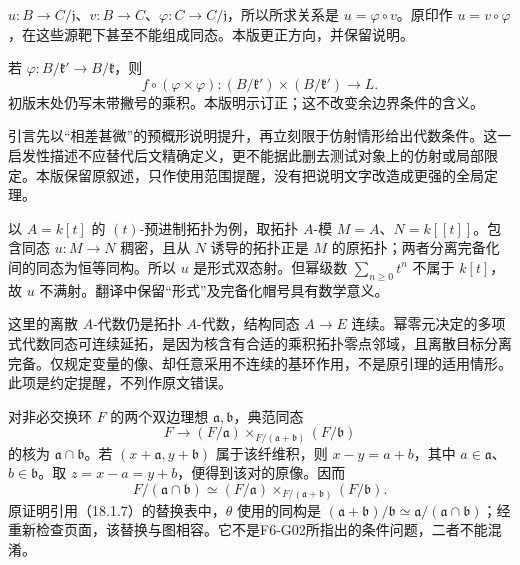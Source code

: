 $u:B\to C/\mathfrak j$、$v:B\to C$、$\varphi:C\to C/\mathfrak j$，所以所求关系是
$u=\varphi\circ v$。原印作 $u=v\circ\varphi$，在这些源靶下甚至不能组成同态。本版更正方向，并保留说明。

若 $\varphi:B/\mathfrak k'\to B/\mathfrak k$，则
\[
 f\circ(\varphi\times\varphi):
 (B/\mathfrak k')\times(B/\mathfrak k')\longrightarrow L.
\]
初版末处仍写未带撇号的乘积。本版明示订正；这不改变余边界条件的含义。

引言先以“相差甚微”的预概形说明提升，再立刻限于仿射情形给出代数条件。这一启发性描述不应替代后文精确定义，更不能据此删去测试对象上的仿射或局部限定。本版保留原叙述，只作使用范围提醒，没有把说明文字改造成更强的全局定理。

以 $A=k[t]$ 的 $(t)$-预进制拓扑为例，取拓扑 $A$-模 $M=A$、$N=k[[t]]$。包含同态 $u:M\to N$ 稠密，且从 $N$ 诱导的拓扑正是 $M$ 的原拓扑；两者分离完备化间的同态为恒等同构。所以 $u$ 是形式双态射。但幂级数 $\sum_{n\ge0}t^n$ 不属于 $k[t]$，故 $u$ 不满射。翻译中保留“形式”及完备化帽号具有数学意义。

这里的离散 $A$-代数仍是拓扑 $A$-代数，结构同态 $A\to E$ 连续。幂零元决定的多项式代数同态可连续延拓，是因为核含有合适的乘积拓扑零点邻域，且离散目标分离完备。仅规定变量的像、却任意采用不连续的基环作用，不是原引理的适用情形。此项是约定提醒，不列作原文错误。

对非必交换环 $F$ 的两个双边理想 $\mathfrak a,\mathfrak b$，典范同态
\[
 F\longrightarrow(F/\mathfrak a)\times_{F/(\mathfrak a+\mathfrak b)}(F/\mathfrak b)
\]
的核为 $\mathfrak a\cap\mathfrak b$。若 $(x+\mathfrak a,y+\mathfrak b)$ 属于该纤维积，则 $x-y=a+b$，其中 $a\in\mathfrak a$、$b\in\mathfrak b$。取 $z=x-a=y+b$，便得到该对的原像。因而
\[
 F/(\mathfrak a\cap\mathfrak b)\simeq
 (F/\mathfrak a)\times_{F/(\mathfrak a+\mathfrak b)}(F/\mathfrak b).
\]
原证明引用（18.1.7）的替换表中，$\theta$ 使用的同构是
$(\mathfrak a+\mathfrak b)/\mathfrak b\simeq\mathfrak a/(\mathfrak a\cap\mathfrak b)$；经重新检查页面，该替换与图相容。它不是F6-G02所指出的条件问题，二者不能混淆。

